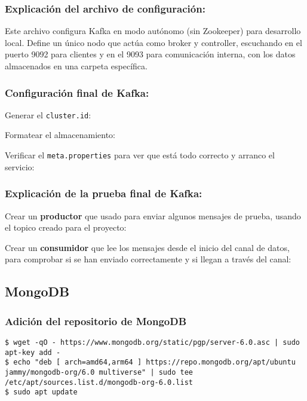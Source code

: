 \documentclass{../../../miPlantilla}
\begin{document}
\subsubsection*{Explicación del archivo de configuración:}

Este archivo configura Kafka en modo autónomo (sin Zookeeper) para desarrollo local. Define un único nodo que actúa como broker y controller,
escuchando en el puerto 9092 para clientes y en el 9093 para comunicación interna, con los datos almacenados en una carpeta específica.

\subsubsection*{Configuración final de Kafka:}

Generar el \texttt{cluster.id}:

Formatear el almacenamiento:

Verificar el \texttt{meta.properties} para ver que está todo correcto y arranco el servicio:

\subsubsection*{Explicación de la prueba final de Kafka:}

Crear un \textbf{productor} que usado para enviar algunos mensajes de prueba, usando el topico creado para el proyecto:

Crear un \textbf{consumidor} que lee los mensajes desde el inicio del canal de datos, para comprobar si se han enviado correctamente y si 
llegan a través del canal:

\subsection{MongoDB}
\label{anexo:mongo}

\subsubsection*{Adición del repositorio de MongoDB}

\begin{lstlisting}
$ wget -qO - https://www.mongodb.org/static/pgp/server-6.0.asc | sudo apt-key add -
$ echo "deb [ arch=amd64,arm64 ] https://repo.mongodb.org/apt/ubuntu jammy/mongodb-org/6.0 multiverse" | sudo tee /etc/apt/sources.list.d/mongodb-org-6.0.list
$ sudo apt update
\end{lstlisting}
\end{document}
